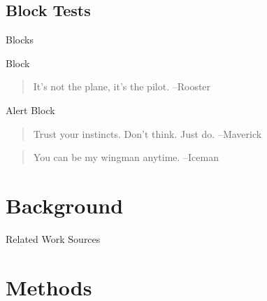 \documentclass[%
  aspectratio=1610,
]{beamer}
\begin{document}
\subsection{Block Tests}
\begin{frame}{Blocks}


\begin{block}{Block}
  \begin{quote}
    It's not the plane, it's the pilot. --Rooster
  \end{quote}
\end{block}

\begin{alertblock}{Alert Block}
  \begin{quote}
    Trust your instincts. Don't think. Just do. --Maverick
  \end{quote}
\end{alertblock}

\begin{example}
  \begin{quote}
    You can be my wingman anytime. --Iceman
  \end{quote}
\end{example}

\end{frame}


\section{Background}


\begin{frame}{Related Work}
  \centering
  {\LARGE Sources}
\end{frame}


\section{Methods}
\end{document}
